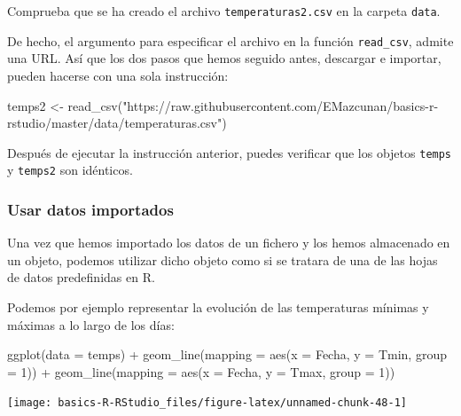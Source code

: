 \documentclass[
  title=normal,
  notoc,
  bib=normal]{mnye}
\newenvironment{Shaded}{\begin{snugshade}}{\end{snugshade}}
\newcommand{\AttributeTok}[1]{\textcolor[rgb]{0.77,0.63,0.00}{#1}}
\newcommand{\DecValTok}[1]{\textcolor[rgb]{0.00,0.00,0.81}{#1}}
\newcommand{\FunctionTok}[1]{\textcolor[rgb]{0.00,0.00,0.00}{#1}}
\newcommand{\NormalTok}[1]{#1}
\newcommand{\OtherTok}[1]{\textcolor[rgb]{0.56,0.35,0.01}{#1}}
\newcommand{\SpecialCharTok}[1]{\textcolor[rgb]{0.00,0.00,0.00}{#1}}
\newcommand{\StringTok}[1]{\textcolor[rgb]{0.31,0.60,0.02}{#1}}
\begin{document}
Comprueba que se ha creado el archivo \texttt{temperaturas2.csv} en la carpeta \texttt{data}.

De hecho, el argumento para especificar el archivo en la función \texttt{read\_csv}, admite una URL. Así que los dos pasos que hemos seguido antes, descargar e importar, pueden hacerse con una sola instrucción:

\begin{Shaded}
\begin{Highlighting}[]
\NormalTok{temps2 }\OtherTok{\textless{}{-}} \FunctionTok{read\_csv}\NormalTok{(}\StringTok{"https://raw.githubusercontent.com/EMazcunan/basics{-}r{-}rstudio/master/data/temperaturas.csv"}\NormalTok{)}
\end{Highlighting}
\end{Shaded}

Después de ejecutar la instrucción anterior, puedes verificar que los objetos \texttt{temps} y \texttt{temps2} son idénticos.

\hypertarget{usar-datos-importados}{%
\subsubsection{Usar datos importados}\label{usar-datos-importados}}

Una vez que hemos importado los datos de un fichero y los hemos almacenado en un objeto, podemos utilizar dicho objeto como si se tratara de una de las hojas de datos predefinidas en \textsf{R}.

Podemos por ejemplo representar la evolución de las temperaturas mínimas y máximas a lo largo de los días:

\begin{Shaded}
\begin{Highlighting}[]
\FunctionTok{ggplot}\NormalTok{(}\AttributeTok{data =}\NormalTok{ temps) }\SpecialCharTok{+} 
    \FunctionTok{geom\_line}\NormalTok{(}\AttributeTok{mapping =} \FunctionTok{aes}\NormalTok{(}\AttributeTok{x =}\NormalTok{ Fecha, }\AttributeTok{y =}\NormalTok{ Tmin, }\AttributeTok{group  =} \DecValTok{1}\NormalTok{)) }\SpecialCharTok{+} 
    \FunctionTok{geom\_line}\NormalTok{(}\AttributeTok{mapping =} \FunctionTok{aes}\NormalTok{(}\AttributeTok{x =}\NormalTok{ Fecha, }\AttributeTok{y =}\NormalTok{ Tmax, }\AttributeTok{group  =} \DecValTok{1}\NormalTok{)) }
\end{Highlighting}
\end{Shaded}

\begin{center}\texttt{[image: basics-R-RStudio\_files/figure-latex/unnamed-chunk-48-1]} \end{center}
\end{document}
